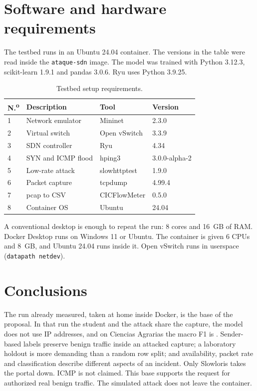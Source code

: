 \documentclass[journal,article,submit,moreauthors]{Definitions/mdpi}
\begin{document}
\section{Software and hardware requirements}\label{sec:requirements}
The testbed runs in an Ubuntu 24.04 container. The versions in the table were read inside the \texttt{ataque-sdn} image. The model was trained with Python 3.12.3, scikit-learn 1.9.1 and pandas 3.0.6. Ryu uses Python 3.9.25.

\begin{table}[H]
\footnotesize
\caption{Testbed setup requirements.\label{tbl:testbed}}
\begin{tabular}{@{}p{0.5cm}p{2.3cm}p{1.7cm}p{1.6cm}@{}}
\toprule
N.\textsuperscript{o} & Description & Tool & Version \\
\midrule
1 & Network emulator & Mininet & 2.3.0 \\
2 & Virtual switch & Open vSwitch & 3.3.9 \\
3 & SDN controller & Ryu & 4.34 \\
4 & SYN and ICMP flood & hping3 & 3.0.0-alpha-2 \\
5 & Low-rate attack & slowhttptest & 1.9.0 \\
6 & Packet capture & tcpdump & 4.99.4 \\
7 & pcap to CSV & CICFlowMeter & 0.5.0 \\
8 & Container OS & Ubuntu & 24.04 \\
\bottomrule
\end{tabular}
\end{table}

A conventional desktop is enough to repeat the run: 8 cores and 16~GB of RAM. Docker Desktop runs on Windows 11 or Ubuntu. The container is given 6 CPUs and 8~GB, and Ubuntu 24.04 runs inside it. Open vSwitch runs in userspace (\texttt{datapath netdev}).

\section{Conclusions}
The run already measured, taken at home inside Docker, is the base of the proposal. In that run the student and the attack share the capture, the model does not use IP addresses, and on Ciencias Agrarias the macro F1 is \Fmacro. Sender-based labels preserve benign traffic inside an attacked capture; a laboratory holdout is more demanding than a random row split; and availability, packet rate and classification describe different aspects of an incident. Only Slowloris takes the portal down. ICMP is not claimed. This base supports the request for authorized real benign traffic. The simulated attack does not leave the container.
\end{document}
